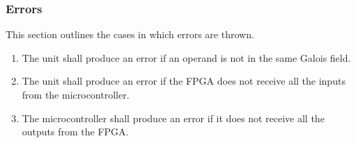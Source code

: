 \documentclass[paper=usletter, fontsize=14pt]{article}
\begin{document}
            \subsubsection{Errors}
            This section outlines the cases in which errors are thrown.
            \begin{enumerate}

                \item The unit shall produce an error if an operand is not in the same Galois field.

                \item The unit shall produce an error if the FPGA does not receive all the inputs from the microcontroller.

                \item The microcontroller shall produce an error if it does not receive all the outputs from the FPGA.

            \end{enumerate}
\end{document}
